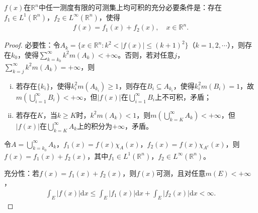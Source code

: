 \documentclass[../../main.tex]{subfiles}%
\begin{document}
\begin{example}
$f(x)$在$\mathbb{R}^n$中任一测度有限的可测集上均可积的充分必要条件是：存在$f_1\in L^1(\mathbb{R}^n)$，$f_2\in L^\infty(\mathbb{R}^n)$，使得
\begin{align*}
f(x)=f_1(x)+f_2(x),\quad x\in\mathbb{R}^n.
\end{align*}
\end{example}
\begin{proof}

{\heiti 必要性：}令$A_k=\{x\in\mathbb{R}^n:k^2<|f(x)|\leqslant(k+1)^2\}$（$k=1,2,\cdots$），则存在$k_0$，使得$\sum\limits_{k=k_0}^\infty k^2m(A_k)<+\infty$。否则，若对任意$j$，$\sum\limits_{k=j}^\infty k^2m(A_k)=+\infty$，则
\begin{enumerate}[(i)]
\item 若存在$\{k_i\}$，使得$k_i^2m(A_{k_i})\geqslant1$，则存在$B_i\subseteq A_{k_i}$，使得$k_i^2m(B_i)=1$，故$m\left(\bigcup\limits_{i=1}^\infty B_i\right)<+\infty$，但$|f(x)|$在$\bigcup\limits_{i=1}^\infty B_i$上不可积，矛盾；
\item 若存在$K$，当$k\geqslant K$时，$k^2m(A_k)<1$，则$m\left(\bigcup\limits_{k=K}^\infty A_k\right)<+\infty$，但$|f(x)|$在$\bigcup\limits_{k=K}^\infty A_k$上的积分为$+\infty$，矛盾。
\end{enumerate}

令$A=\bigcup\limits_{k=k_0}^\infty A_k$，$f_1(x)=f(x)\chi_A(x)$，$f_2(x)=f(x)\chi_{A^c}(x)$，则$f(x)=f_1(x)+f_2(x)$，其中$f_1\in L^1(\mathbb{R}^n)$，$f_2\in L^\infty(\mathbb{R}^n)$。

{\heiti 充分性：}若$f(x)=f_1(x)+f_2(x)$，则$f(x)$可测，且对任意$m(E)<+\infty$，
\begin{align*}
\int_E|f(x)|\mathrm{d}x\leqslant\int_E|f_1(x)|\mathrm{d}x+\int_E|f_2(x)|\mathrm{d}x<\infty.
\end{align*}

\end{proof}
\end{document}
